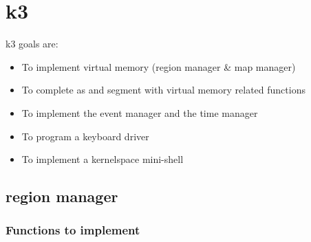 
\section{k3}

k3 goals are:

\begin{itemize}

\item To implement virtual memory (region manager \& map manager)

\item To complete as and segment with virtual memory related functions

\item To implement the event manager and the time manager

\item To program a keyboard driver

\item To implement a kernelspace mini-shell

\end{itemize}

\subsection{region manager}

\subsubsection{Functions to implement}





